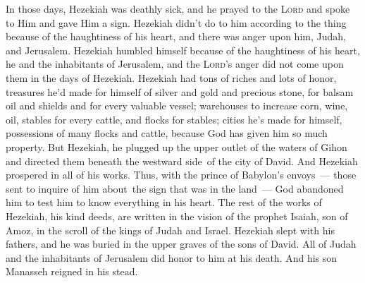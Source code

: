 \begin{inparaenum}
   In those days, Hezekiah was deathly sick, and he prayed to the \textsc{Lord} and spoke to Him and gave Him a sign.%
   Hezekiah didn't do to him according to the thing because of the haughtiness of his heart, and there was anger upon him, Judah, and Jerusalem.%
   Hezekiah humbled himself because of the haughtiness of his heart, he and the inhabitants of Jerusalem, and the \textsc{Lord}'s anger did not come upon them in the days of Hezekiah.%
   Hezekiah had tons of riches and lots of honor, treasures he'd made for himself of silver and gold and precious stone, for balsam oil and shields and for every valuable vessel;%
   warehouses to increase corn, wine, oil, stables for every cattle, and flocks for stables;%
   cities he's made for himself, possessions of many flocks and cattle, because God has given him so much property.%
   But Hezekiah, he plugged up the upper outlet of the waters of Gihon and directed them beneath the westward side\understood\ of the city of David. And Hezekiah prospered in all of his works.%
   Thus, with the prince of Babylon's envoys~--- those sent to inquire of him about\understood\ the sign that was in the land~--- God abandoned him to test him to know everything in his heart.%
   The rest of the works of Hezekiah, his kind deeds, are written in the vision of the prophet Isaiah, son of Amoz, in the scroll of the kings of Judah and Israel.%
   Hezekiah slept with his fathers, and he was buried in the upper graves of the sons of David. All of Judah and the inhabitants of Jerusalem did honor to him at his death. And his son Manasseh reigned in his stead.%
\end{inparaenum}
